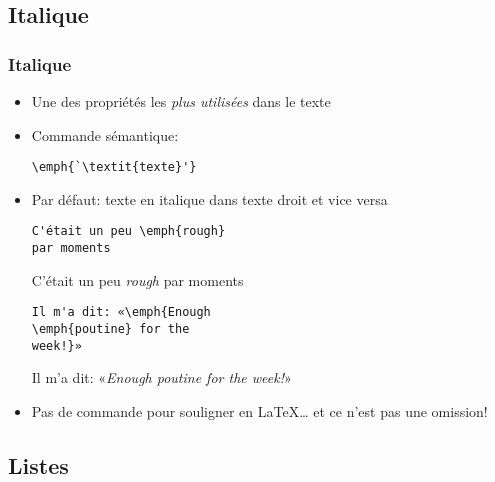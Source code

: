 \subsection{Italique}

\begin{frame}[fragile]
  \frametitle{Italique}
  \begin{itemize}
  \item<1-> Une des propriétés les \emph{plus utilisées} dans le texte
    \vfill
  \item<1-> Commande sémantique:
\begin{lstlisting}
\emph{`\textit{texte}'}
\end{lstlisting}
    \vfill
  \item<2-> Par défaut: texte en italique dans texte droit et vice versa
    \begin{demo}
      \small
      \begin{texample}[0.48\linewidth]
\begin{lstlisting}
C'était un peu \emph{rough}
par moments
\end{lstlisting}
        \producing
        C'était un peu \emph{rough} par moments
      \end{texample}

      \begin{texample}[0.48\linewidth]
\begin{lstlisting}
Il m'a dit: «\emph{Enough
\emph{poutine} for the
week!}»
\end{lstlisting}
        \producing
        Il m'a dit: «\emph{Enough \emph{poutine} for the week!}»
      \end{texample}
    \end{demo}
  \item<3-> Pas de commande pour souligner en {\LaTeX\dots} et ce n'est
    pas une omission!
  \end{itemize}
\end{frame}

\subsection{Listes}

